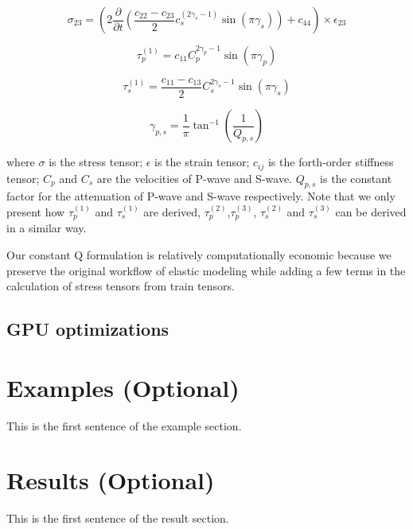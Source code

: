 \documentclass{paris17}
\begin{document}
\begin{equation}
  \sigma_{23} = \left ( 2\frac{\partial}{\partial t} \left( \frac{c_{22}-c_{23}}{2}c_s^{(2\gamma_s-1)}\sin(\pi\gamma_s) \right) + c_{44} \right )\times \epsilon_{23}
\end{equation}

\begin{equation}
  \tau_p^{(1)} = c_{11}C_p^{2\gamma_p - 1}\sin(\pi \gamma_p)
\end{equation}

\begin{equation}
  \tau_s^{(1)} = \frac{c_{11} - c_{13}}{2}C_s^{2\gamma_s - 1}\sin(\pi \gamma_s)
\end{equation}

\begin{equation}
  \gamma_{p,s}=\frac{1}{\pi}\tan^{-1}(\frac{1}{Q_{p,s}})
\end{equation}

where $\sigma$ is the stress tensor; $\epsilon$ is the strain tensor; $c_{ij}$ is the forth-order stiffness tensor; $C_p$ and $C_s$ are the velocities of P-wave and S-wave. $Q_{p,s}$ is the constant factor for the attenuation of P-wave and S-wave respectively. Note that we only present how $\tau_p^{(1)}$ and $\tau_s^{(1)}$ are derived, $\tau_p^{(2)}$,$\tau_p^{(3)}$, $\tau_s^{(2)}$ and $\tau_s^{(3)}$ can be derived in a similar way.

Our constant Q formulation is relatively computationally economic because we preserve the original workflow of elastic modeling while adding a few terms in the calculation of stress tensors from train tensors.

\subsection{GPU optimizations}



\section{Examples (Optional)}

This is the first sentence of the example section.

\section{Results (Optional)}

This is the first sentence of the result section.
\end{document}
